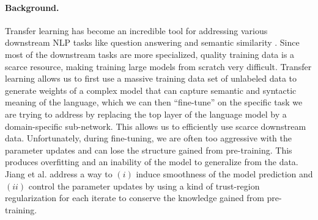 \documentclass{article}
\begin{document}
\paragraph{Background.}
Transfer learning has become an incredible tool for addressing various downstream NLP tasks like question answering and semantic similarity \cite{weiss2016survey}. Since most of the downstream tasks are more specialized, quality training data is a scarce resource, making training large models from scratch very difficult. Transfer learning allows us to first use a massive training data set of unlabeled data to generate weights of a complex model that can capture semantic and syntactic meaning of the language, which we can then “fine-tune” on the specific task we are trying to address by replacing the top layer of the language model by a domain-specific sub-network. This allows us to efficiently use scarce downstream data. Unfortunately, during fine-tuning, we are often too aggressive with the parameter updates and can lose the structure gained from pre-training. This produces overfitting and an inability of the model to generalize from the data. Jiang et al. \cite{smart} address a way to $(i)$ induce smoothness of the model prediction and $(ii)$ control the parameter updates by using a kind of trust-region regularization for each iterate to conserve the knowledge gained from pre-training.

  
\end{document}
